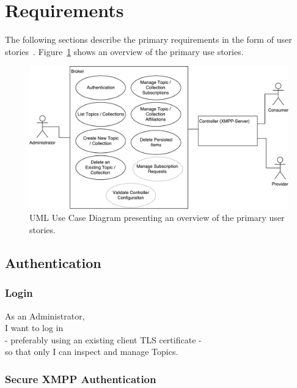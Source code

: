 
\section{Requirements}\label{sec:requirements}

The following sections describe the primary requirements in the form of user stories~\cite{agile-alliance-user-stories}.
Figure~\ref{fig:requirements-overview} shows an overview of the primary use stories.

\begin{figure}[h]
    \centering
    \includegraphics[width=1\linewidth]{resources/requirements_overview}
    \caption{UML Use Case Diagram presenting an overview of the primary user stories.}
    \label{fig:requirements-overview}
\end{figure}

\subsection{Authentication}
\subsubsection{Login}

As an Administrator,\\
I want to log in\\
- preferably using an existing client TLS certificate - \\
so that only I can inspect and manage Topics.\\

\subsubsection{Secure XMPP Authentication}

